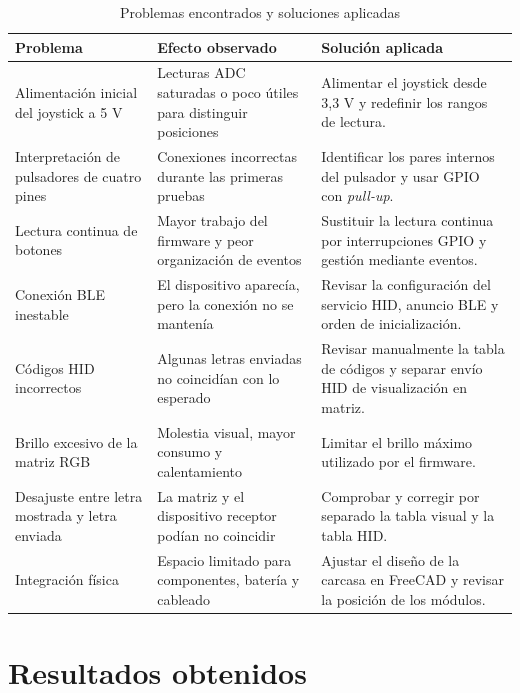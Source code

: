 \begin{table}[H]
    \centering
    \caption{Problemas encontrados y soluciones aplicadas}
    \label{tab:problemas-soluciones}
    \begin{tabularx}{\textwidth}{@{}p{}p{}X@{}}
        \toprule
        \textbf{Problema} & \textbf{Efecto observado} & \textbf{Solución aplicada} \\
        \midrule
        Alimentación inicial del joystick a 5 V & Lecturas ADC saturadas o poco útiles para distinguir posiciones & Alimentar el joystick desde 3,3 V y redefinir los rangos de lectura. \\
        Interpretación de pulsadores de cuatro pines & Conexiones incorrectas durante las primeras pruebas & Identificar los pares internos del pulsador y usar GPIO con \textit{pull-up}. \\
        Lectura continua de botones & Mayor trabajo del firmware y peor organización de eventos & Sustituir la lectura continua por interrupciones GPIO y gestión mediante eventos. \\
        Conexión BLE inestable & El dispositivo aparecía, pero la conexión no se mantenía & Revisar la configuración del servicio HID, anuncio BLE y orden de inicialización. \\
        Códigos HID incorrectos & Algunas letras enviadas no coincidían con lo esperado & Revisar manualmente la tabla de códigos y separar envío HID de visualización en matriz. \\
        Brillo excesivo de la matriz RGB & Molestia visual, mayor consumo y calentamiento & Limitar el brillo máximo utilizado por el firmware. \\
        Desajuste entre letra mostrada y letra enviada & La matriz y el dispositivo receptor podían no coincidir & Comprobar y corregir por separado la tabla visual y la tabla HID. \\
        Integración física & Espacio limitado para componentes, batería y cableado & Ajustar el diseño de la carcasa en FreeCAD y revisar la posición de los módulos. \\
        \bottomrule
    \end{tabularx}
\end{table}

\section{Resultados obtenidos}
\label{sec:resultados-obtenidos}

